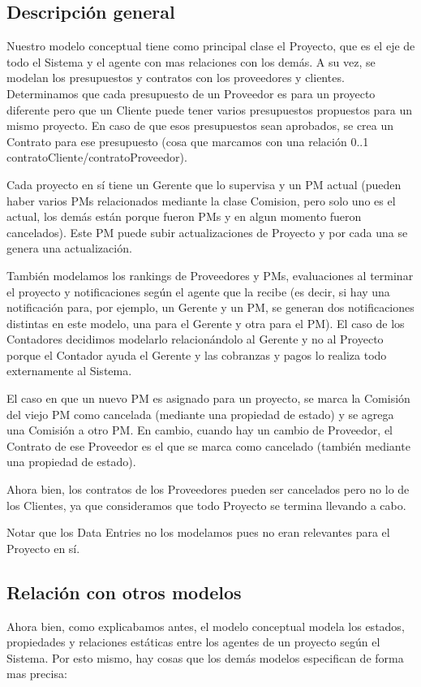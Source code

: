 \subsection{Descripción general}
Nuestro modelo conceptual tiene como principal clase el Proyecto, que es el eje de todo el Sistema y el agente con mas relaciones con los demás. A su vez, se modelan los presupuestos y contratos con los proveedores y clientes. Determinamos que cada presupuesto de un Proveedor es para un proyecto diferente pero que un Cliente puede tener varios presupuestos propuestos para un mismo proyecto. En caso de que esos presupuestos sean aprobados, se crea un Contrato para ese presupuesto (cosa que marcamos con una relación 0..1 contratoCliente/contratoProveedor).

Cada proyecto en sí tiene un Gerente que lo supervisa y un PM actual (pueden haber varios PMs relacionados mediante la clase Comision, pero solo uno es el actual, los demás están porque fueron PMs y en algun momento fueron cancelados). Este PM puede subir actualizaciones de Proyecto y por cada una se genera una actualización.

También modelamos los rankings de Proveedores y PMs, evaluaciones al terminar el proyecto y notificaciones según el agente que la recibe (es decir, si hay una notificación para, por ejemplo, un Gerente y un PM, se generan dos notificaciones distintas en este modelo, una para el Gerente y otra para el PM).
El caso de los Contadores decidimos modelarlo relacionándolo al Gerente y no al Proyecto porque el Contador ayuda el Gerente y las cobranzas y pagos lo realiza todo externamente al Sistema.

El caso en que un nuevo PM es asignado para un proyecto, se marca la Comisión del viejo PM como cancelada (mediante una propiedad de estado) y se agrega una Comisión a otro PM. En cambio, cuando hay un cambio de Proveedor, el Contrato de ese Proveedor es el que se marca como cancelado (también mediante una propiedad de estado).

Ahora bien, los contratos de los Proveedores pueden ser cancelados pero no lo de los Clientes, ya que consideramos que todo Proyecto se termina llevando a cabo. 

Notar que los Data Entries no los modelamos pues no eran relevantes para el Proyecto en sí.

\subsection{Relación con otros modelos}
Ahora bien, como explicabamos antes, el modelo conceptual modela los estados, propiedades y relaciones estáticas entre los agentes de un proyecto según el Sistema. Por esto mismo, hay cosas que los demás modelos especifican de forma mas precisa:

